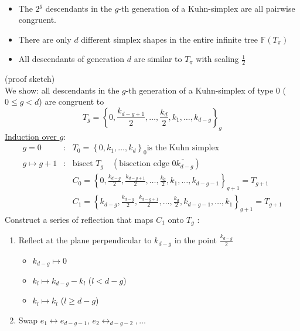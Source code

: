 \begin{theorem}\
	\begin{itemize}
		\item The $2^g$ descendants in the $g$-th generation of a Kuhn-simplex are all pairwise congruent.
		\item There are only $d$ different simplex shapes in the entire infinite tree $\mathbb{F}(T_{\pi})$
		\item All descendants of generation $d$ are similar to $T_{\pi}$ with scaling $\frac{1}{2}$
			
	\end{itemize}
\end{theorem}
\begin{proof_}
	(proof sketch)\\
	We show: all descendants in the $g$-th generation of a Kuhn-simplex of type $0$ ($0 \leq g < d$) are congruent to
	\begin{equation*}
		T_{g}= \left\{0, \frac{k_{d-g+1}}{2},\dots ,\frac{k_{d}}{2},k_{1},\dots ,k_{d-g} \right\}_{g}
	\end{equation*}
	\underline{Induction over $g$}:
	\begin{align*}
		g=0&: & T_{0}= \left\{0,k_{1},\dots ,k_{d} \right\}_{0} \text{is the Kuhn simplex}\\
		g\mapsto g+1&: &\text{bisect } T_{g}\quad ( \text{bisection edge } \overline{0k_{d-g}})\\
		 && C_{0}= \left\{ 0, \frac{k_{d-g}}{2},\frac{k_{d-g+1}}{2},\dots , \frac{k_{d}}{2},k_{1},\dots ,k_{d-g-1} \right\}_{g+1}= T_{g+1}\\
		 && C_{1}= \left\{ k_{d-g}, \frac{k_{d-g}}{2},\frac{k_{d-g+1}}{2},\dots , \frac{k_{d}}{2},k_{d-g-1},\dots ,k_{1} \right\}_{g+1}= T_{g+1}
	\end{align*}
	Construct a series of reflection that maps $C_{1}$ onto $T_{g}$ :
	\begin{enumerate}
		\item Reflect at the plane perpendicular to $k_{d-g}$ in the point $\frac{k_{d-g}}{2}$
			\begin{itemize}
				\item $k_{d-g} \mapsto 0$
				\item $k_{l} \mapsto k_{d-g}-k_{l}$ ($l < d-g$)
				\item $k_{l} \mapsto k_{l}$ ($l \geq d-g$)
			\end{itemize}
		\item Swap $e_{1}\leftrightarrow e_{d-g-1}$, $e_{2} \leftrightarrow_{d-g-2},\dots $
			\begin{itemize}

\end{itemize}
\end{enumerate}
\end{proof_}
